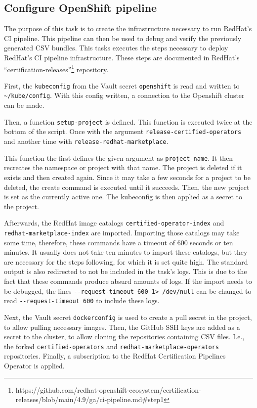 \subsection{Configure OpenShift pipeline}\label{subsec:configure-openshift-pipeline}

The purpose of this task is to create the infrastructure necessary to run RedHat's CI pipeline.
This pipeline can then be used to debug and verify the previously generated CSV bundles.
This tasks executes the steps necessary to deploy RedHat's CI pipeline infrastructure.
These steps are documented in RedHat's ``certification-releases''\footnote{https://github.com/redhat-openshift-ecosystem/certification-releases/blob/main/4.9/ga/ci-pipeline.md\#step1} repository.

First, the \verb|kubeconfig| from the Vault secret \verb|openshift| is read and written to \verb|~/kube/config|.
With this config written, a connection to the Openshift cluster can be made.

Then, a function \verb|setup-project| is defined.
This function is executed twice at the bottom of the script.
Once with the argument \verb|release-certified-operators| and another time with \verb|release-redhat-marketplace|.

This function the first defines the given argument as \verb|project_name|.
It then recreates the namespace or project with that name.
The project is deleted if it exists and then created again.
Since it may take a few seconds for a project to be deleted, the create command is executed until it succeeds.
Then, the new project is set as the currently active one.
The kubeconfig is then applied as a secret to the project.

Afterwards, the RedHat image catalogs \verb|certified-operator-index| and \\ \verb|redhat-marketplace-index| are imported.
Importing those catalogs may take some time, therefore, these commands have a timeout of 600 seconds or ten minutes.
It usually does not take ten minutes to import these catalogs, but they are necessary for the steps following, for which it is set quite high.
The standard output is also redirected to not be included in the task's logs.
This is due to the fact that these commands produce absurd amounts of logs.
If the import needs to be debugged, the lines \verb|--request-timeout 600 1> /dev/null| can be changed to read \verb|--request-timeout 600| to include these logs.

Next, the Vault secret \verb|dockerconfig| is used to create a pull secret in the project, to allow pulling necessary images.
Then, the GitHub SSH keys are added as a secret to the cluster, to allow cloning the repositories containing CSV files.
I.e., the forked \verb|certified-operators| and \verb|redhat-marketplace-operators| repositories.
Finally, a subscription to the RedHat Certification Pipelines Operator is applied.
